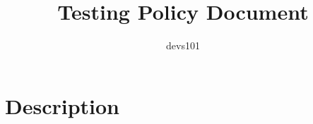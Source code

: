 \documentclass{article}
\title{Testing Policy Document}
\author{devs101}
\begin{document}
\tableofcontents
\newpage

\section{Description}
\end{document}

